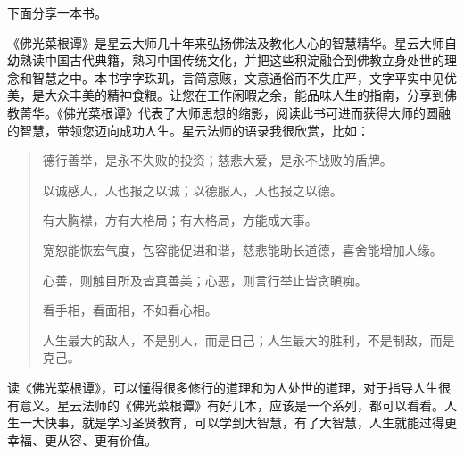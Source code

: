 下面分享一本书。

\begin{book}
    《佛光菜根谭》是星云大师几十年来弘扬佛法及教化人心的智慧精华。星云大师自幼熟读中国古代典籍，熟习中国传统文化，并把这些积淀融合到佛教立身处世的理念和智慧之中。本书字字珠玑，言简意赅，文意通俗而不失庄严，文字平实中见优美，是大众丰美的精神食粮。让您在工作闲暇之余，能品味人生的指南，分享到佛教菁华。《佛光菜根谭》代表了大师思想的缩影，阅读此书可进而获得大师的圆融的智慧，带领您迈向成功人生。星云法师的语录我很欣赏，比如：

    \begin{quotation}
        德行善举，是永不失败的投资；慈悲大爱，是永不战败的盾牌。

        以诚感人，人也报之以诚；以德服人，人也报之以德。

        有大胸襟，方有大格局；有大格局，方能成大事。

        宽恕能恢宏气度，包容能促进和谐，慈悲能助长道德，喜舍能增加人缘。

        心善，则触目所及皆真善美；心恶，则言行举止皆贪瞋痴。

        看手相，看面相，不如看心相。

        人生最大的敌人，不是别人，而是自己；人生最大的胜利，不是制敌，而是克己。
    \end{quotation}

    读《佛光菜根谭》，可以懂得很多修行的道理和为人处世的道理，对于指导人生很有意义。星云法师的《佛光菜根谭》有好几本，应该是一个系列，都可以看看。人生一大快事，就是学习圣贤教育，可以学到大智慧，有了大智慧，人生就能过得更幸福、更从容、更有价值。
\end{book}

